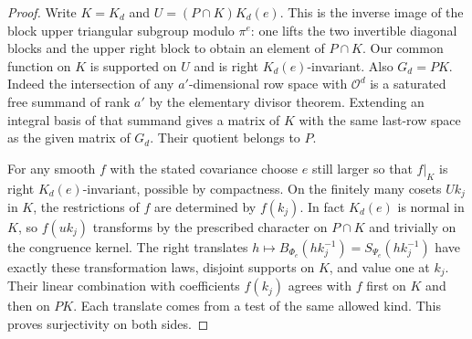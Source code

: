 \begin{proof}
Write \(K=K_d\) and \(U=(P\cap K)K_d(e)\). This is the inverse image
of the block upper triangular subgroup modulo \(\pi^e\): one lifts
the two invertible diagonal blocks and the upper right block to obtain
an element of \(P\cap K\). Our common function on \(K\) is supported
on \(U\) and is right \(K_d(e)\)-invariant. Also \(G_d=PK\). Indeed
the intersection of any \(a'\)-dimensional row space with \(\mathcal O^d\)
is a saturated free summand of rank \(a'\) by the elementary divisor
theorem. Extending an integral basis of that summand gives a matrix of
\(K\) with the same last-row space as the given matrix of \(G_d\).
Their quotient belongs to \(P\).

For any smooth \(f\) with the stated covariance choose \(e\) still
larger so that \(f|_K\) is right \(K_d(e)\)-invariant, possible by
compactness. On the finitely many cosets \(U k_j\) in \(K\), the
restrictions of \(f\) are determined by \(f(k_j)\). In fact \(K_d(e)\)
is normal in \(K\), so \(f(uk_j)\) transforms by the prescribed
character on \(P\cap K\) and trivially on the congruence kernel.
The right translates \(h\mapsto B_{\Phi_e}(hk_j^{-1})
=S_{\Psi_e}(hk_j^{-1})\) have exactly these transformation laws,
disjoint supports on \(K\), and value one at \(k_j\). Their linear
combination with coefficients \(f(k_j)\) agrees with \(f\) first on
\(K\) and then on \(PK\). Each translate comes from a test of the
same allowed kind. This proves surjectivity on both sides.
\end{proof}

